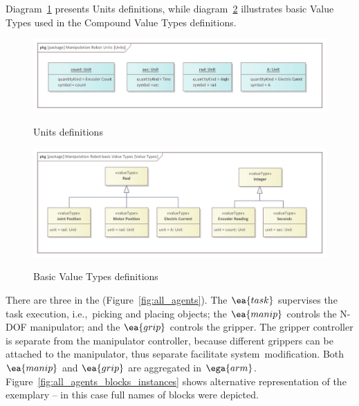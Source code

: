\documentclass[11pt,oneside,a4paper]{article}
\newcommand{\Figure}[0]{Figure}
\begin{document}
	Diagram~\ref{fig:units} presents Units definitions, while diagram~\ref{fig:basic_value_types} illustrates basic Value Types used in the Compound Value Types definitions.

	\begin{figure}[H]
	\centering
	\begin{center}
		{\includegraphics[width=\columnwidth]{img/value_types/units.png}}
	\end{center}
	\caption{Units definitions}
	\label{fig:units}
	\end{figure}

	\begin{figure}[H]
	\centering
	\begin{center}
		{\includegraphics[width=\columnwidth]{img/value_types/basic_value_types.png}}
	\end{center}
	\caption{Basic Value Types definitions}
	\label{fig:basic_value_types}
	\end{figure}
	
	There are three \Agents{} in the \System{} (\Figure{}~\ref{fig:all_agents}).
	The \Agent{} $\ea{task}$ supervises the task execution, i.e.,\ picking and placing objects; the \Agent{} $\ea{manip}$ controls the N-DOF manipulator; and the \Agent{}
	$\ea{grip}$ controls the gripper. The gripper controller is separate from the manipulator controller, because different grippers can be attached to the manipulator, thus separate
	\Agents{} facilitate system~modification. Both $\ea{manip}$ and $\ea{grip}$ are aggregated in \GroupofAgents{} $\ega{arm}$. Figure~\ref{fig:all_agents_blocks_instances} shows alternative representation of the exemplary \System{} -- in this case full names of blocks were depicted.
	
\end{document}
